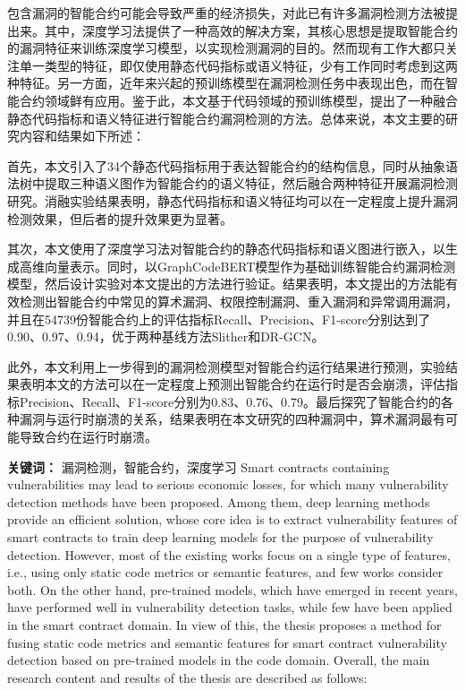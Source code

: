 \cleardoublepage
{}
包含漏洞的智能合约可能会导致严重的经济损失，对此已有许多漏洞检测方法被提出来。其中，深度学习法提供了一种高效的解决方案，其核心思想是提取智能合约的漏洞特征来训练深度学习模型，以实现检测漏洞的目的。然而现有工作大都只关注单一类型的特征，即仅使用静态代码指标或语义特征，少有工作同时考虑到这两种特征。另一方面，近年来兴起的预训练模型在漏洞检测任务中表现出色，而在智能合约领域鲜有应用。鉴于此，本文基于代码领域的预训练模型，提出了一种融合静态代码指标和语义特征进行智能合约漏洞检测的方法。总体来说，本文主要的研究内容和结果如下所述：

首先，本文引入了34个静态代码指标用于表达智能合约的结构信息，同时从抽象语法树中提取三种语义图作为智能合约的语义特征，然后融合两种特征开展漏洞检测研究。消融实验结果表明，静态代码指标和语义特征均可以在一定程度上提升漏洞检测效果，但后者的提升效果更为显著。

其次，本文使用了深度学习法对智能合约的静态代码指标和语义图进行嵌入，以生成高维向量表示。同时，以GraphCodeBERT模型作为基础训练智能合约漏洞检测模型，然后设计实验对本文提出的方法进行验证。结果表明，本文提出的方法能有效检测出智能合约中常见的算术漏洞、权限控制漏洞、重入漏洞和异常调用漏洞，并且在\num{54739}份智能合约上的评估指标Recall、Precision、F1-score分别达到了0.90、0.97、0.94，优于两种基线方法Slither和DR-GCN。
    
此外，本文利用上一步得到的漏洞检测模型对智能合约运行结果进行预测，实验结果表明本文的方法可以在一定程度上预测出智能合约在运行时是否会崩溃，评估指标Precision、Recall、F1-score分别为0.83、0.76、0.79。最后探究了智能合约的各种漏洞与运行时崩溃的关系，结果表明在本文研究的四种漏洞中，算术漏洞最有可能导致合约在运行时崩溃。


\hspace*{\fill}

\noindent \textbf{关键词：} 漏洞检测，智能合约，深度学习
\cleardoublepage
{}
Smart contracts containing vulnerabilities may lead to serious economic losses, for which many vulnerability detection methods have been proposed. Among them, deep learning methods provide an efficient solution, whose core idea is to extract vulnerability features of smart contracts to train deep learning models for the purpose of vulnerability detection. However, most of the existing works focus on a single type of features, i.e., using only static code metrics or semantic features, and few works consider both. On the other hand, pre-trained models, which have emerged in recent years, have performed well in vulnerability detection tasks, while few have been applied in the smart contract domain. In view of this, the thesis proposes a method for fusing static code metrics and semantic features for smart contract vulnerability detection based on pre-trained models in the code domain. Overall, the main research content and results of the thesis are described as follows:

